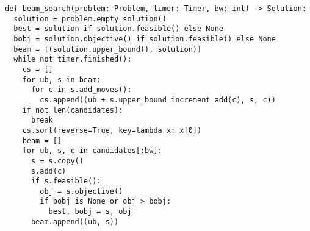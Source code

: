 \begin{lstlisting}[float=h,caption={Beam Search Solver},label=lst:bs]
def beam_search(problem: Problem, timer: Timer, bw: int) -> Solution:
  solution = problem.empty_solution()
  best = solution if solution.feasible() else None
  bobj = solution.objective() if solution.feasible() else None 
  beam = [(solution.upper_bound(), solution)]
  while not timer.finished():
    cs = []
    for ub, s in beam:
      for c in s.add_moves():
        cs.append((ub + s.upper_bound_increment_add(c), s, c))
    if not len(candidates):
      break
    cs.sort(reverse=True, key=lambda x: x[0])
    beam = []
    for ub, s, c in candidates[:bw]:
      s = s.copy()
      s.add(c)
      if s.feasible():
        obj = s.objective()
        if bobj is None or obj > bobj:
          best, bobj = s, obj
      beam.append((ub, s))
\end{lstlisting}